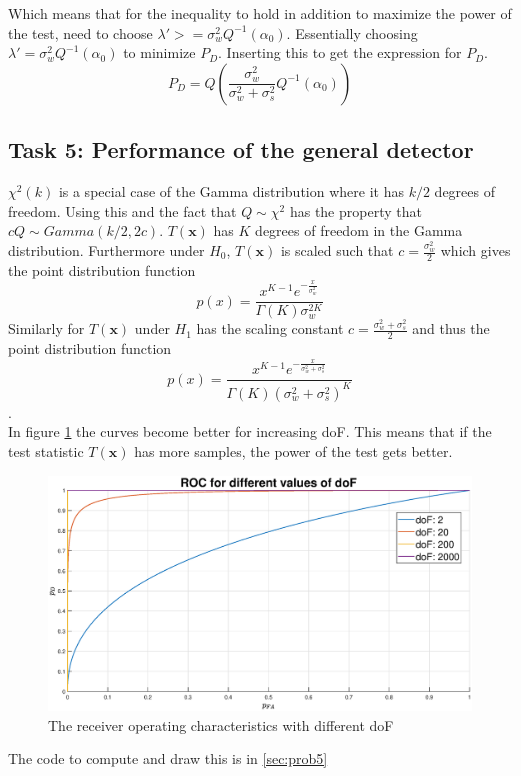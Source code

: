 Which means that for the inequality to hold in addition to maximize the power of the test, need to choose $\lambda' >= \sigma_w^2Q^{-1}\left(\alpha_0\right)$. Essentially choosing $\lambda' = \sigma_w^2Q^{-1}\left(\alpha_0\right)$ to minimize $P_D$. Inserting this to get the expression for $P_D$.
\begin{equation}
    P_D = Q(\frac{\sigma_w^2}{\sigma_w^2+\sigma_s^2}Q^{-1}\left(\alpha_0\right))
\end{equation}

\subsection{Task 5: Performance of the general detector}
$\chi^2(k)$ is a special case of the Gamma distribution where it has $k/2$ degrees of freedom. Using this and the fact that $Q\sim\chi^2$ has the property that $cQ\sim Gamma(k/2, 2c)$. $T(\mathbf{x})$ has $K$ degrees of freedom in the Gamma distribution. Furthermore under $H_0$, $T(\mathbf{x})$ is scaled such that $c = \frac{\sigma_w^2}{2}$ which gives the point distribution function
\begin{equation}
    p(x) = \frac{x^{K-1}e^{-\frac{x}{\sigma_w^2}}}{\Gamma(K)\sigma_w^{2K}}
\end{equation}
Similarly for $T(\mathbf{x})$ under $H_1$ has the scaling constant $c = \frac{\sigma_w^2+\sigma_s^2}{2}$ and thus the point distribution function
\begin{equation}
    p(x) = \frac{x^{K-1}e^{-\frac{x}{\sigma_w^2+\sigma_s^2}}}{\Gamma(K)(\sigma_w^{2}+\sigma_s^2)^K}
\end{equation}.\\
In figure \ref{fig:roc} the curves become better for increasing doF. This means that if the test statistic $T(\mathbf{x})$ has more samples, the power of the test gets better.
\begin{figure}
    \centering
    \includegraphics[width=\textwidth]{figures/roc2.eps}
    \caption{The receiver operating characteristics with different doF}
    \label{fig:roc}
\end{figure}
The code to compute and draw this is in \ref{sec:prob5}
